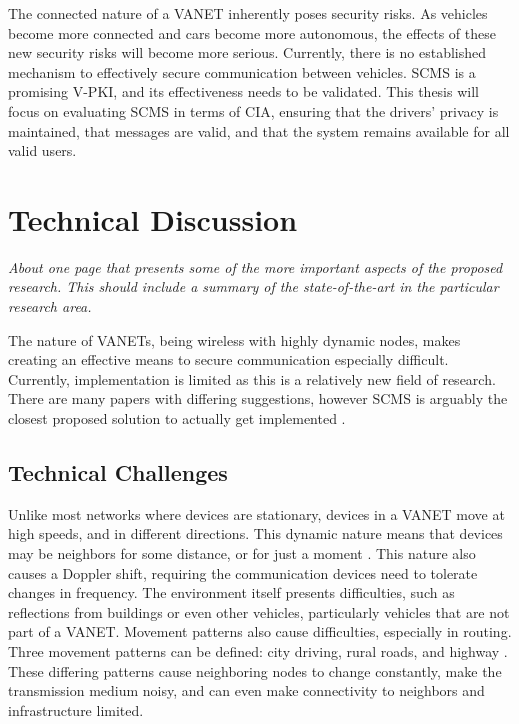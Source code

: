 \documentclass {article}
\newcommand{\sechint}[1]{\small{\emph{#1}} \bigskip}
\begin{document}
The connected nature of a VANET inherently poses security risks. As vehicles become more connected and cars become more autonomous, the effects of these new security risks will become more serious. Currently, there is no established mechanism to effectively secure communication between vehicles. SCMS is a promising V-PKI, and its effectiveness needs to be validated. This thesis will focus on evaluating SCMS in terms of CIA, ensuring that the drivers' privacy is maintained, that messages are valid, and that the system remains available for all valid users.

\section{Technical Discussion}{\sechint{About one page that presents some of the more important aspects of the proposed research. This should include a summary of the state-of-the-art in the particular research area.}}

The nature of VANETs, being wireless with highly dynamic nodes, makes creating an effective means to secure communication especially difficult. Currently, implementation is limited as this is a relatively new field of research. There are many papers with differing suggestions, however SCMS is arguably the closest proposed solution to actually get implemented \autocite{SecCredMgr}.

\subsection{Technical Challenges}
Unlike most networks where devices are stationary, devices in a VANET move at high speeds, and in different directions. This dynamic nature means that devices may be neighbors for some distance, or for just a moment \autocite{CommPatterns}. This nature also causes a Doppler shift, requiring the communication devices need to tolerate changes in frequency. The environment itself presents difficulties, such as reflections from buildings or even other vehicles, particularly vehicles that are not part of a VANET. Movement patterns also cause difficulties, especially in routing. Three movement patterns can be defined: city driving, rural roads, and highway \autocite{CommPatterns}. These differing patterns cause neighboring nodes to change constantly, make the transmission medium noisy, and can even make connectivity to neighbors and infrastructure limited.
\end{document}
